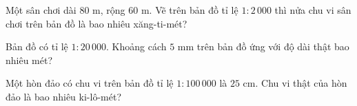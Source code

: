 \begin{ex}
  Một sân chơi dài $80\text{ m}$, rộng $60\text{ m}$. Vẽ trên bản đồ tỉ lệ $1 : 2\,000$ thì nửa chu vi sân chơi trên bản đồ là bao nhiêu xăng-ti-mét?
\end{ex}

\begin{ex}
  Bản đồ có tỉ lệ $1 : 20\,000$. Khoảng cách $5\text{ mm}$ trên bản đồ ứng với độ dài thật bao nhiêu mét?
\end{ex}

\begin{ex}
  Một hòn đảo có chu vi trên bản đồ tỉ lệ $1 : 100\,000$ là $25\text{ cm}$. Chu vi thật của hòn đảo là bao nhiêu ki-lô-mét?
\end{ex}
